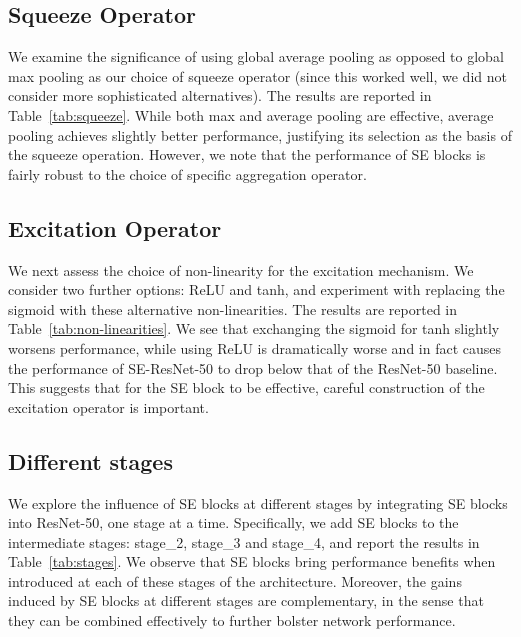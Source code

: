 \subsection{Squeeze Operator} \label{subsec:ablation-squeeze}

We examine the significance of using global average pooling as opposed to global max pooling as our choice of squeeze operator (since this worked well, we did not consider more sophisticated alternatives).  The results are reported in Table~\ref{tab:squeeze}.  While both max and average pooling are effective, average pooling achieves slightly better performance, justifying its selection as the basis of the squeeze operation.  However, we note that the performance of SE blocks is fairly robust to the choice of specific aggregation operator.

\subsection{Excitation Operator} \label{subsec:ablation-excitation}

We next assess the choice of non-linearity for the excitation mechanism.  We consider two further options: ReLU and tanh, and experiment with replacing the sigmoid with these alternative non-linearities. The results are reported in Table~\ref{tab:non-linearities}. We see that exchanging the sigmoid for tanh slightly worsens performance, while using ReLU is dramatically worse and in fact causes the performance of \mbox{SE-ResNet-50} to drop below that of the \mbox{ResNet-50} baseline.  This suggests that for the SE block to be effective, careful construction of the excitation operator is important.



\subsection{Different stages} \label{subsec:ablation-stages}

We explore the influence of SE blocks at different stages by integrating SE blocks into ResNet-50, one stage at a time. Specifically, we add SE blocks to the intermediate stages: stage\_2, stage\_3 and stage\_4, and report the results in Table~\ref{tab:stages}.  We observe that SE blocks bring performance benefits when introduced at each of these stages of the architecture. Moreover, the gains induced by SE blocks at different stages are complementary, in the sense that they can be combined effectively to further bolster network performance.


